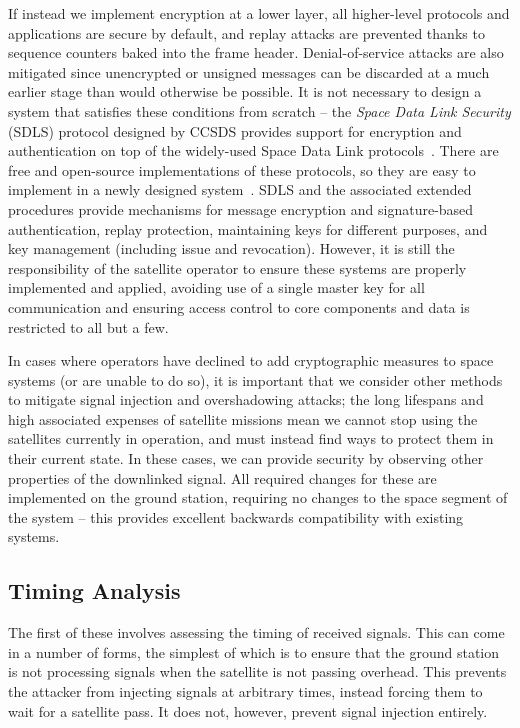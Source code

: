 If instead we implement encryption at a lower layer, all higher-level protocols and applications are secure by default, and replay attacks are prevented thanks to sequence counters baked into the frame header.
Denial-of-service attacks are also mitigated since unencrypted or unsigned messages can be discarded at a much earlier stage than would otherwise be possible.
It is not necessary to design a system that satisfies these conditions from scratch -- the \textit{Space Data Link Security} (SDLS) protocol designed by CCSDS provides support for encryption and authentication on top of the widely-used Space Data Link protocols~\cite{ccsdsSpace2015,ccsdsSpace2020}.
There are free and open-source implementations of these protocols, so they are easy to implement in a newly designed system~\cite{nasaCryptolib}.
SDLS and the associated extended procedures provide mechanisms for message encryption and signature-based authentication, replay protection, maintaining keys for different purposes, and key management (including issue and revocation).
However, it is still the responsibility of the satellite operator to ensure these systems are properly implemented and applied, avoiding use of a single master key for all communication and ensuring access control to core components and data is restricted to all but a few.

In cases where operators have declined to add cryptographic measures to space systems (or are unable to do so), it is important that we consider other methods to mitigate signal injection and overshadowing attacks; the long lifespans and high associated expenses of satellite missions mean we cannot stop using the satellites currently in operation, and must instead find ways to protect them in their current state.
In these cases, we can provide security by observing other properties of the downlinked signal.
All required changes for these are implemented on the ground station, requiring no changes to the space segment of the system -- this provides excellent backwards compatibility with existing systems.


\subsection{Timing Analysis}

The first of these involves assessing the timing of received signals.
This can come in a number of forms, the simplest of which is to ensure that the ground station is not processing signals when the satellite is not passing overhead.
This prevents the attacker from injecting signals at arbitrary times, instead forcing them to wait for a satellite pass.
It does not, however, prevent signal injection entirely.

